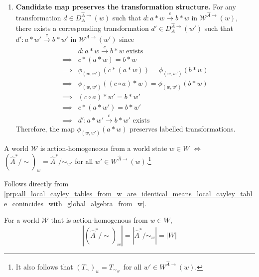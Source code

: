\begin{proofE}
\begin{enumerate}
\begin{enumerate}
        \item \textbf{Candidate map preserves the transformation structure.}
        For any transformation $d \in D_{A}^{\hat{A}\to}(w)$ such that $d: a \ast w \xrightarrow{c} b \ast w$ in $\mathscr{W}^{\hat{A}\to}(w)$, there exists a corresponding transformation $d' \in D_{A}^{\hat{A}\to}(w')$ such that $d': a \ast w' \xrightarrow{c} b \ast w'$ in $\mathscr{W}^{\hat{A}\to}(w')$ since
        \begin{align}
            & d: a \ast w \xrightarrow{c} b \ast w \text{ exists} \\
            \implies & c \ast (a \ast w) = b \ast w \\
            \implies & \phi_{(w, w')}(c \ast (a \ast w)) = \phi_{(w, w')}(b \ast w) \\
            \implies & \phi_{(w, w')}((c \circ a) \ast w) = \phi_{(w, w')}(b \ast w) \\
            \implies & (c \circ a) \ast w' = b \ast w' \\
            \implies & c \ast (a \ast w') = b \ast w' \\
            \implies & d': a \ast w' \xrightarrow{c} b \ast w' \text{ exists}
        \end{align}
        Therefore, the map $\phi_{(w, w')}(a \ast w)$ preserves labelled transformations.
    \end{enumerate}
\end{enumerate}
\end{proofE}

\begin{corollaryE}
    A world $\mathscr{W}$ is action-homogeneous from a world state $w \in W$ $\iff$ $(\hat{A}^{*}/\sim)_{w} = \hat{A}^{*}/\sim_{w'}$ for all $w' \in W^{\hat{A}\to}(w)$.\footnote{
    It also follows that $(T_{\sim})_{w} = T_{\sim_{w'}}$ for all $w' \in W^{\hat{A}\to}(w)$.
    }
\end{corollaryE}
\begin{proofE}
    Follows directly from \cref{prp:all_local_cayley_tables_from_w_are_identical_means_local_cayley_table_conincides_with_global_algebra_from_w}.
\end{proofE}

\begin{corollaryE}
    For a world $\mathscr{W}$ that is action-homogenous from $w \in W$,
    \begin{equation}
        |(\hat{A}^{*}/\sim)_{w}| = |\hat{A}^{*}/\sim_{w}| = |W|
    \end{equation}
\end{corollaryE}


